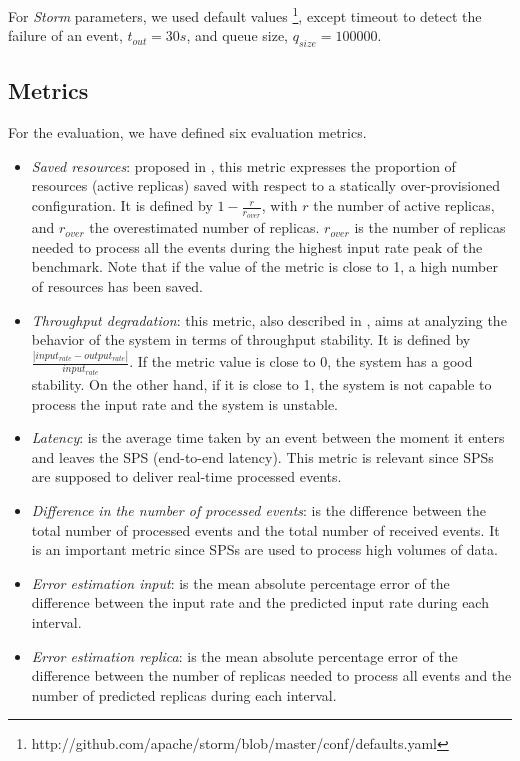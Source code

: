 For \textit{Storm} parameters, we used default values \footnote{http://github.com/apache/storm/blob/master/conf/defaults.yaml}, except timeout to detect the failure of an event, $t_{out}=30s$, and queue size, $q_{size}=100000$. 

\subsection{Metrics}
\label{exp:metric}
For the evaluation, we have defined six evaluation metrics.
\begin{itemize}
    \item \textit{Saved resources}: proposed in \cite{LombardiABQ18}, this metric expresses the proportion of resources (active replicas) saved with respect to a statically over-provisioned configuration.
    It is defined by  $1-\frac{r}{r_{over}}$, with $r$ the number of active replicas, and $r_{over}$ the overestimated number of replicas. $r_{over}$ is the number of replicas needed to process all the events during the highest input rate peak of the benchmark. Note that if the value of the metric is close to 1, a high number of resources has been saved.
    \item \textit{Throughput degradation}: this  metric, also described in \cite{LombardiABQ18}, aims at analyzing the behavior of the system in terms of throughput stability. It is defined by  $\frac{\left | input_{rate} - output_{rate} \right |}{input_{rate}}$.  If the metric value is close to 0, the system has a good stability. On the other hand, if it is close to 1, the system is not capable to process the input rate and the system is unstable.
    \item \textit{Latency}: is the average time taken by an event between the moment it enters and leaves the SPS (end-to-end latency). This metric is relevant since SPSs are supposed to deliver real-time processed events.
    \item \textit{Difference in the number of processed events}: is the difference between the total number of processed events and the total number of received events. It is an important metric since SPSs are used to process high volumes of data.
    \item \textit{Error estimation input}: is the mean absolute percentage error of the difference between the input rate and the predicted input rate during each interval.
    \item \textit{Error estimation replica}: is the mean absolute percentage error of the difference between the number of replicas needed to process all events and the number of predicted replicas during each interval.
\end{itemize}

